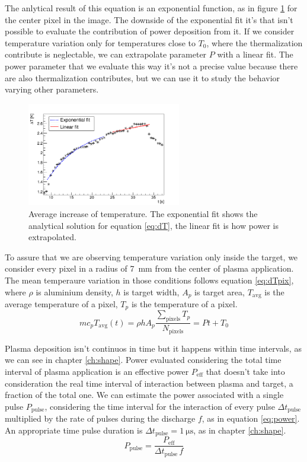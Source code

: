 The anlytical result of this equation is an exponential function, as in figure \ref{fig:dTfit} for the center pixel in the image. The downside of the exponential fit it's that isn't possible to evaluate the contribution of power deposition from it. If we consider temperature variation only for temperatures close to $T_{0}$, where the thermalization contribute is neglectable, we can extrapolate parameter $P$ with a linear fit. The power parameter that we evaluate this way it's not a precise value because there are also thermalization contributes, but we can use it to study the behavior varying other parameters.
\begin{figure}
 \centering
 \includegraphics[width=0.6\textwidth]{Images/Temperature/f5t4d4_fits.png}
 \caption{Average increase of temperature. The exponential fit shows the analytical solution for equation \ref{eq:dT}, the linear fit is how power is extrapolated.}
 \label{fig:dTfit}
\end{figure}

To assure that we are observing temperature variation only inside the target, we consider every pixel in a radius of \SI{7}{\milli\meter} from the center of plasma application. The mean temperaure variation in those conditions follows equation \ref{eq:dTpix}, where $\rho$ is aluminium density, $h$ is target width, $A_p$ is target area, $T_{\text{avg}}$ is the average temperature of a pixel, $T_p$ is the temperature of a pixel.
\begin{equation}
 m c_{p} T_{\text{avg}}(t) = \rho h A_{p}\frac{\sum_{\text{pixels}} T_{p}}{N_{\text{pixels}}} = P t + T_{0}
 \label{eq:dTpix}
\end{equation}


Plasma deposition isn't continuos in time but it happens within time intervals, as we can see in chapter \ref{ch:shape}.
Power evaluated considering the total time interval of plasma application is an effective power $P_{\text{eff}}$ that doesn't take into consideration the real time interval of interaction between plasma and target, a fraction of the total one. We can estimate the power associated with a single pulse $P_{\text{pulse}}$, considering the time interval for the interaction of every pulse $\Delta t_{\text{pulse}}$ multiplied by the rate of pulses during the discharge $f$, as in equation \ref{eq:power}. An appropriate time pulse duration is $\Delta t_{\text{pulse}} = \SI{1}{\micro\second}$, as in chapter \ref{ch:shape}.
\begin{equation}
 P_{\text{pulse}} = \frac{P_{\text{eff}}}{\Delta t_{\text{pulse}} \, f}
 \label{eq:power}
\end{equation}


